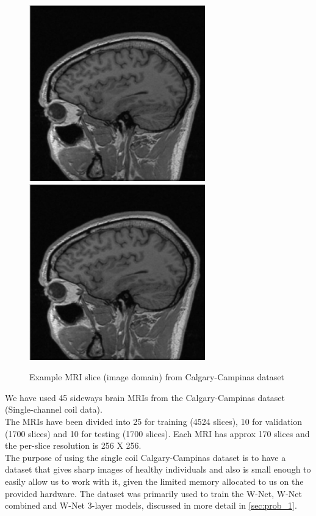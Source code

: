 \begin{figure}[!htbp]
  \begin{center}
    \leavevmode
    \ifpdf
      \includegraphics[height=3in]{Chapter3/Chapter3Figs/calgary_campinas_image.jpg}
    \else
      \includegraphics[bb = 92 86 545 742, height=3in]{Chapter3/Chapter3Figs/calgary_campinas_image.jpg}
    \fi
    \caption{Example MRI slice (image domain) from Calgary-Campinas dataset}
    \label{campinas1}
  \end{center}
\end{figure}

We have used 45 sideways brain MRIs from the Calgary-Campinas dataset (Single-channel coil data).\\

The MRIs have been divided into 25 for training (4524 slices), 10 for validation (1700 slices) and 10 for testing (1700 slices). Each MRI has approx 170 slices and the per-slice resolution is 256 X 256.\\

The purpose of using the single coil Calgary-Campinas dataset is to have a dataset that gives sharp images of healthy individuals and also is small enough to easily allow us to work with it, given the limited memory allocated to us on the provided hardware. The dataset was primarily used to train the W-Net, W-Net combined and W-Net 3-layer models, discussed in more detail in \ref{sec:prob_1}.\\

